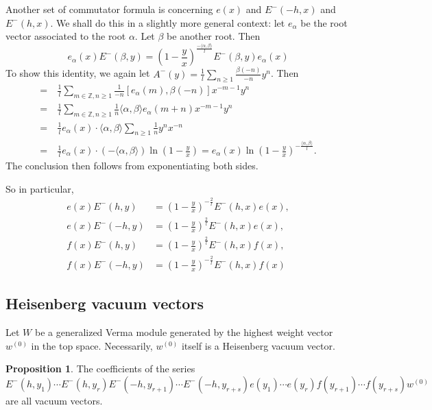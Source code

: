 \documentclass{article}
\theoremstyle{definition}
\newtheorem{prop}[theorem]{Proposition}
\newcommand{\Z}{{\mathbb Z}}
\begin{document}
Another set of commutator formula is concerning $e(x)$ and $E^-(-h, x)$ and $E^-(h, x)$. We shall do this in a slightly more general context: let $e_\alpha$ be the root vector associated to the root $\alpha$. Let $\beta$ be another root. Then $$e_\alpha(x)E^-(\beta,y) = \left(1-\frac y x\right)^{\frac{-\langle \alpha, \beta\rangle}{l}}E^-(\beta,y)e_\alpha(x)$$
To show this identity, we again let $A^-(y) = \frac 1 l \sum_{n\geq 1} \frac{\beta(-n)}{-n}y^{n}$. Then 
\begin{align*}
    [e_\alpha(x), A^-(y)] = \ & \frac 1 l\sum_{m\in \Z, n \geq 1} \frac 1 {-n}[e_\alpha(m), \beta(-n)] x^{-m-1}y^n\\
    =\ &\frac 1 l \sum_{m\in \Z, n \geq 1} \frac 1 {n} \langle \alpha, \beta\rangle e_\alpha(m+n) x^{-m-1}y^n \\
    =\ & \frac 1 le_\alpha(x)\cdot \langle \alpha, \beta\rangle \sum_{n\geq 1} \frac 1 n y^n x^{-n}\\
    = \ & \frac 1 le_\alpha(x) \cdot \left(-\langle \alpha, \beta\rangle \right)\ln\left(1-\frac y x\right) = e_\alpha(x) \ln\left(1-\frac y x\right)^{-\frac {\langle \alpha, \beta\rangle} l}. 
\end{align*}
The conclusion then follows from exponentiating both sides. 

So in particular, 
\begin{align*}
    e(x)E^-(h,y) &= \left(1- \frac y x\right)^{-\frac 2 l}E^-(h,x)e(x), \\
    e(x)E^-(-h,y) &= \left(1- \frac y x\right)^{\frac 2 l}E^-(h,x)e(x),\\
    f(x)E^-(h,y) &= \left(1- \frac y x\right)^{\frac 2 l}E^-(h,x)f(x), \\
    f(x)E^-(-h,y) &= \left(1- \frac y x\right)^{-\frac 2 l}E^-(h,x)f(x)
\end{align*}

\subsection{Heisenberg vacuum vectors} Let $W$ be a generalized Verma module generated by the highest weight vector $w^{(0)}$ in the top space. Necessarily, $w^{(0)}$ itself is a Heisenberg vacuum vector. 

\begin{prop}
    The coefficients of the series
    $$E^-(h, y_1)\cdots E^-(h,y_r) E^-(-h, y_{r+1}) \cdots E^-(-h, y_{r+s}) e(y_1)\cdots e(y_r) f(y_{r+1}) \cdots f(y_{r+s})w^{(0)}$$
    are all vacuum vectors. 
\end{prop}
\end{document}
